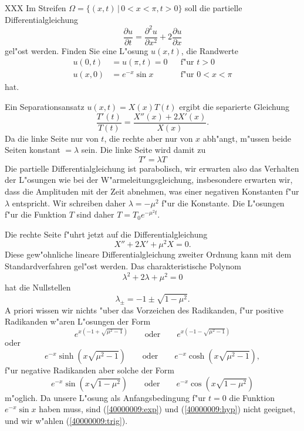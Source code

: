XXX
Im Streifen $\Omega=\{ (x,t)\, |\, 0<x<\pi, t > 0\}$ soll die partielle
Differentialgleichung
\[
\frac{\partial u}{\partial t}
=
\frac{\partial^2 u}{\partial x^2}+2\frac{\partial u}{\partial x}
\]
gel"ost werden. Finden Sie eine L"osung $u(x,t)$, die Randwerte
\begin{align*}
u(0,t)&=u(\pi,t)=0&&\text{f"ur $t>0$}\\
u(x,0)&=e^{-x}\sin x&&\text{f"ur $0<x<\pi$}
\end{align*}
hat.

\begin{loesung}
Ein Separationsansatz $u(x,t)=X(x)T(t)$ ergibt die separierte Gleichung
\[
\frac{T'(t)}{T(t)}
=
\frac{X''(x)+2X'(x)}{X(x)}.
\]
Da die linke Seite nur von $t$, die rechte aber nur von $x$ abh"angt,
m"ussen beide Seiten konstant $=\lambda$ sein. Die linke Seite wird
damit zu
\[
T' = \lambda T
\]
Die partielle Differentialgleichung ist parabolisch, wir erwarten also
das Verhalten der L"osungen wie bei der W"armeleitungsgleichung, insbesondere
erwarten wir, dass die Amplituden mit der Zeit abnehmen, was einer
negativen Konstanten f"ur $\lambda$ entspricht. Wir schreiben daher
$\lambda=-\mu^2$ f"ur die Konstante.
Die L"osungen f"ur die Funktion $T$ sind daher $T=T_0e^{-\mu^2t}$.

Die rechte Seite f"uhrt jetzt auf die Differentialgleichung
\[
X''+2X'+\mu^2X=0.
\]
Diese gew"ohnliche lineare Differentialgleichung zweiter Ordnung
kann mit dem Standardverfahren gel"ost werden. Das charakteristische
Polynom 
\[
\lambda^2+2\lambda +\mu^2=0
\]
hat die Nullstellen
\[
\lambda_{\pm}=-1\pm\sqrt{1-\mu^2}.
\]
A priori wissen wir nichts "uber das Vorzeichen des Radikanden,
f"ur positive Radikanden w"aren L"osungen der Form
\begin{equation}
e^{x(-1+ \sqrt{\mu^2-1})}
\qquad
\text{oder}
\qquad
e^{x(-1-\sqrt{\mu^2-1})}
\label{40000009:exp}
\end{equation}
oder
\begin{equation}
e^{-x}\sinh(x\sqrt{\mu^2-1})
\qquad
\text{oder}
\qquad
e^{-x}\cosh(x\sqrt{\mu^2-1}),
\label{40000009:hyp}
\end{equation}
f"ur negative Radikanden aber solche der Form
\begin{equation}
e^{-x}\sin(x\sqrt{1-\mu^2})
\qquad
\text{oder}
\qquad
e^{-x}\cos(x\sqrt{1-\mu^2})
\label{40000009:trig}
\end{equation}
m"oglich. Da unsere L"osung als Anfangsbedingung f"ur $t=0$ die
Funktion $e^{-x}\sin x$ haben muss, sind (\ref{40000009:exp}) 
und (\ref{40000009:hyp}) nicht geeignet, und wir
w"ahlen (\ref{40000009:trig}).


\end{loesung}
